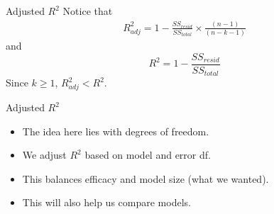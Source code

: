\begin{frame}{Adjusted $R^2$}
    Notice that
    \begin{align*}
        R^2_{adj} = 1 - \frac{SS_{resid}}{SS_{total}}\times\frac{(n-1)}{(n-k-1)}
    \end{align*}
    and
    \[
        R^2 = 1 - \frac{SS_{resid}}{SS_{total}}
    \]
    Since $k \ge 1$, $R^2_{adj} < R^2$.
\end{frame}

\begin{frame}{Adjusted $R^2$}
    \begin{itemize}
        \item The idea here lies with degrees of freedom.
        \item We adjust $R^2$ based on model and error df.
        \item This balances efficacy and model size (what we wanted).
        \item This will also help us compare models.
    \end{itemize}
\end{frame}
